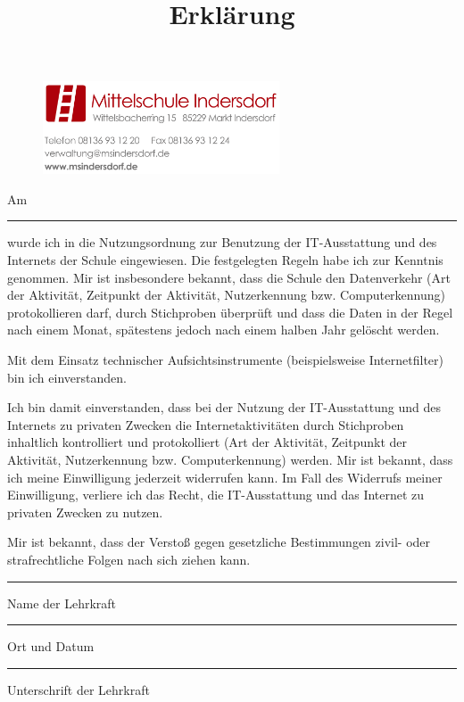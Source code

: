 \documentclass[a4paper, parskip]{scrartcl}
\title{Erklärung}
\date{}
\begin{document}
\thispagestyle{empty}

\begin{figure}
	\flushright
	\includegraphics[width=7cm]{logo_briefkopf}
	\vspace{2cm}
\end{figure}


Am \rule{2cm}{.3pt} wurde ich in die Nutzungsordnung zur Benutzung der
IT-Ausstattung und des Internets der Schule eingewiesen. Die festgelegten
Regeln habe ich zur Kenntnis genommen. Mir ist insbesondere bekannt, dass die
Schule den Datenverkehr (Art der Aktivität, Zeitpunkt der Aktivität,
Nutzerkennung bzw. Computerkennung) protokollieren darf, durch Stichproben
überprüft und dass die Daten in der Regel nach einem Monat, spätestens jedoch
nach einem halben Jahr gelöscht werden.

Mit dem Einsatz technischer Aufsichtsinstrumente (beispielsweise
Internetfilter) bin ich einverstanden.

Ich bin damit einverstanden, dass bei der Nutzung der IT-Ausstattung und des
Internets zu privaten Zwecken die Internetaktivitäten durch Stichproben
inhaltlich kontrolliert und protokolliert (Art der Aktivität, Zeitpunkt der
Aktivität, Nutzerkennung bzw. Computerkennung) werden. Mir ist bekannt, dass
ich meine Einwilligung jederzeit widerrufen kann. Im Fall des Widerrufs meiner
Einwilligung, verliere ich das Recht, die IT-Ausstattung und das Internet zu
privaten Zwecken zu nutzen.

Mir ist bekannt, dass der Verstoß gegen gesetzliche Bestimmungen zivil- oder
strafrechtliche Folgen nach sich ziehen kann. \\
\vspace{2cm}

\parbox{6cm}{\hrule
\strut \footnotesize Name der Lehrkraft}

\parbox{6cm}{\hrule
\strut \footnotesize Ort und Datum}
\hfill\parbox{7cm}{\hrule
\strut \footnotesize Unterschrift der Lehrkraft}
\end{document}
